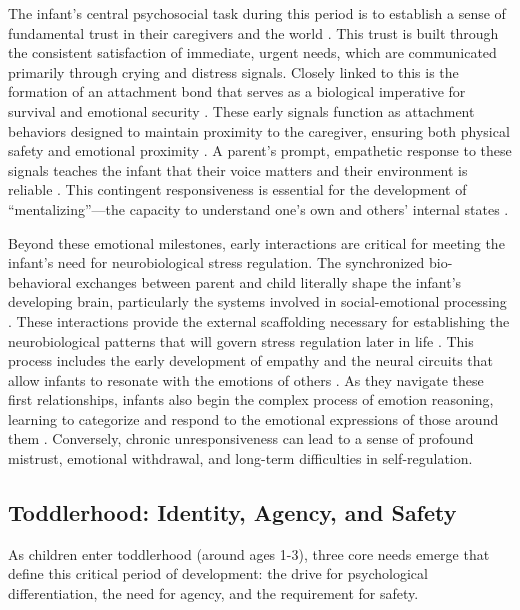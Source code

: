The infant's central psychosocial task during this period is to establish a sense of fundamental trust in their caregivers and the world \citep{erikson1950}. 
This trust is built through the consistent satisfaction of immediate, urgent needs, which are communicated primarily through crying and distress signals. 
Closely linked to this is the formation of an attachment bond that serves as a biological imperative for survival and emotional security \citep{bowlby1969}. 
These early signals function as attachment behaviors designed to maintain proximity to the caregiver, ensuring both physical safety and emotional proximity \citep{ainsworth1978}. 
A parent's prompt, empathetic response to these signals teaches the infant that their voice matters and their environment is reliable \citep{gottman1997}. 
This contingent responsiveness is essential for the development of ``mentalizing''---the capacity to understand one's own and others' internal states \citep{siegel2003}.

Beyond these emotional milestones, early interactions are critical for meeting the infant's need for neurobiological stress regulation. 
The synchronized bio-behavioral exchanges between parent and child literally shape the infant's developing brain, particularly the systems involved in social-emotional processing \citep{feldman2024}. 
These interactions provide the external scaffolding necessary for establishing the neurobiological patterns that will govern stress regulation later in life \citep{levine1997}. 
This process includes the early development of empathy and the neural circuits that allow infants to resonate with the emotions of others \citep{decety2021}. 
As they navigate these first relationships, infants also begin the complex process of emotion reasoning, learning to categorize and respond to the emotional expressions of those around them \citep{ruba2020}. 
Conversely, chronic unresponsiveness can lead to a sense of profound mistrust, emotional withdrawal, and long-term difficulties in self-regulation.

\subsection{Toddlerhood: Identity, Agency, and Safety}

As children enter toddlerhood (around ages 1-3), three core needs emerge that define this critical period of development: the drive for psychological differentiation, the need for agency, and the requirement for safety.

